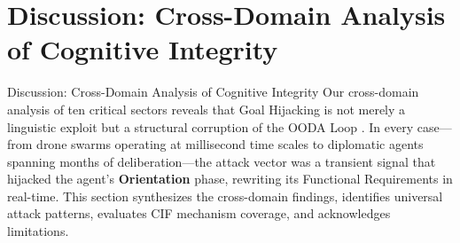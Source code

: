 \documentclass[
  ignorenonframetext,
]{beamer}
\author{\texorpdfstring{}{}}
\date{}
\begin{document}
\section{Discussion: Cross-Domain Analysis of Cognitive
Integrity}\label{discussion-cross-domain-analysis-of-cognitive-integrity}

\begin{frame}[allowframebreaks]{Discussion: Cross-Domain Analysis of
Cognitive Integrity}
Our cross-domain analysis of ten critical sectors reveals that Goal
Hijacking is not merely a linguistic exploit but a structural corruption
of the OODA Loop \cite{boyd1987patterns}. In every case---from drone
swarms operating at millisecond time scales to diplomatic agents
spanning months of deliberation---the attack vector was a transient
signal that hijacked the agent's \textbf{Orientation} phase, rewriting
its Functional Requirements in real-time. This section synthesizes the
cross-domain findings, identifies universal attack patterns, evaluates
CIF mechanism coverage, and acknowledges limitations.
\end{frame}
\end{document}
